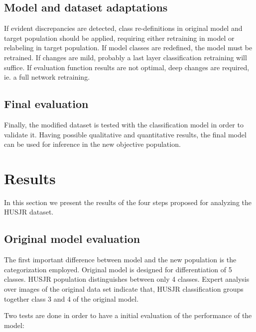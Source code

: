 \subsection{Model and dataset adaptations}

If evident discrepancies are detected, class re-definitions in original model and target population should be applied, requiring either retraining in model or relabeling in target population. If model classes are redefined, the model must be retrained. If changes are mild, probably a last layer classification retraining will suffice. If evaluation function results are not optimal, deep changes are required, ie. a full network retraining.

\subsection{Final evaluation}

Finally, the modified dataset is tested with the classification model in order to validate it. Having possible qualitative and quantitative results, the final model can be used for inference in the new objective population.

\section{Results}



In this section we present the results of the four steps proposed for analyzing the HUSJR dataset.

\subsection{Original model evaluation}

The first important difference between model and the new population is the categorization employed. Original model is designed for differentiation of 5 classes. HUSJR population distinguishes between only 4 classes. Expert analysis over images of the original data set indicate that, HUSJR classification groups together class 3 and 4 of the original model. 

Two tests are done in order to have a initial evaluation of the performance of the model: 

